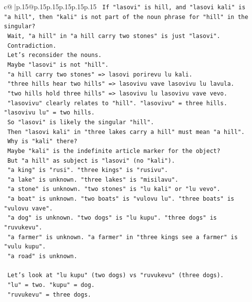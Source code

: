 \documentclass{article}
\begin{document}
{\begin{supertabular}{c@{$\;$}|p{.15\linewidth}@{}p{.15\linewidth}p{.15\linewidth}p{.15\linewidth}p{.15\linewidth}p{.15\linewidth}}
{{{\texttt{   If "lasovi" is hill, and "lasovi kali" is "a hill", then "kali" is not part of the noun phrase for "hill" in the singular?} \\
\texttt{   Wait, "a hill" in "a hill carry two stones" is just "lasovi".} \\
\texttt{   Contradiction.} \\
\texttt{   Let's reconsider the nouns.} \\
\texttt{   Maybe "lasovi" is not "hill".} \\
\texttt{   "a hill carry two stones" => lasovi porirevu lu kali.} \\
\texttt{   "three hills hear two hills" => lasovivu vave lasovivu lu lavula.} \\
\texttt{   "two hills hold three hills" => lasovivu lu lasovivu vave vevo.} \\
\texttt{   "lasovivu" clearly relates to "hill". "lasovivu" = three hills. "lasovivu lu" = two hills.} \\
\texttt{   So "lasovi" is likely the singular "hill".} \\
\texttt{   Then "lasovi kali" in "three lakes carry a hill" must mean "a hill".} \\
\texttt{   Why is "kali" there?} \\
\texttt{   Maybe "kali" is the indefinite article marker for the object?} \\
\texttt{   But "a hill" as subject is "lasovi" (no "kali").} \\
\texttt{   "a king" is "rusi". "three kings" is "rusivu".} \\
\texttt{   "a lake" is unknown. "three lakes" is "misilavu".} \\
\texttt{   "a stone" is unknown. "two stones" is "lu kali" or "lu vevo".} \\
\texttt{   "a boat" is unknown. "two boats" is "vulovu lu". "three boats" is "vulovu vave".} \\
\texttt{   "a dog" is unknown. "two dogs" is "lu kupu". "three dogs" is "ruvukevu".} \\
\texttt{   "a farmer" is unknown. "a farmer" in "three kings see a farmer" is "vulu kupu".} \\
\texttt{   "a road" is unknown.} \\
\\ 
\texttt{   Let's look at "lu kupu" (two dogs) vs "ruvukevu" (three dogs).} \\
\texttt{   "lu" = two. "kupu" = dog.} \\
\texttt{   "ruvukevu" = three dogs.} \\
}}}
\end{supertabular}}
\end{document}
